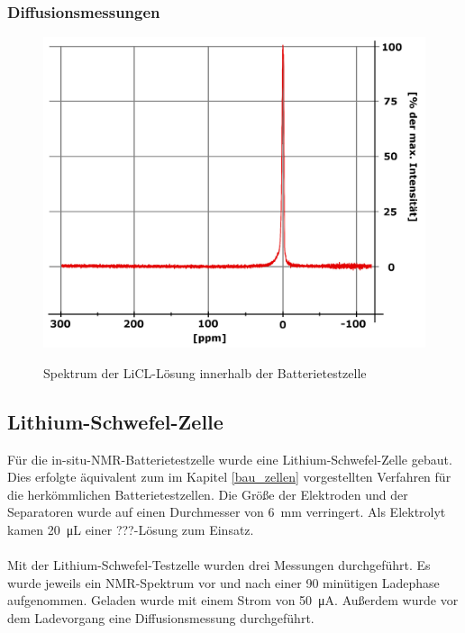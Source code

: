 \documentclass[a4paper, 11pt, headsepline,footsepline,twoside,abstract]{scrbook}
\begin{document}
\subsubsection{Diffusionsmessungen}
\begin{figure}
	\centering
	\includegraphics[width=0.75\columnwidth]{images/LiCl_Batterie.jpg}
	\label{LiCl_Batterie_NMR} 
	\caption{Spektrum der LiCL-Lösung innerhalb der Batterietestzelle}
	\label{LiCl_Batterie_NMR}
\end{figure} 
\subsection{Lithium-Schwefel-Zelle}
Für die in-situ-NMR-Batterietestzelle wurde eine Lithium-Schwefel-Zelle gebaut. Dies erfolgte äquivalent zum im Kapitel \ref{bau_zellen} vorgestellten Verfahren für die herkömmlichen Batterietestzellen. Die Größe der Elektroden und der Separatoren wurde auf einen Durchmesser von \SI{6}{\milli\meter} verringert. Als Elektrolyt kamen \SI{20}{\micro\liter} einer ???-Lösung zum Einsatz.
\\\\
Mit der Lithium-Schwefel-Testzelle wurden drei Messungen durchgeführt. Es wurde jeweils ein NMR-Spektrum vor und nach einer 90 minütigen Ladephase aufgenommen. Geladen wurde mit einem Strom von \SI{50}{\micro\ampere}. Außerdem wurde vor dem Ladevorgang eine Diffusionsmessung durchgeführt.
\end{document}
